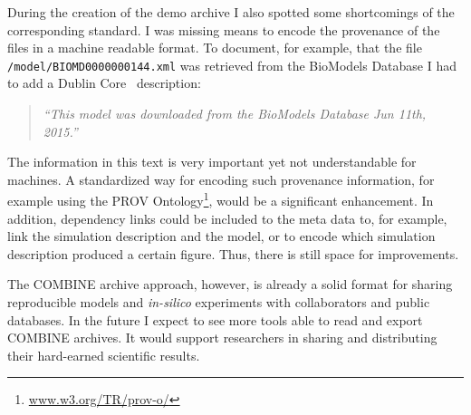 During the creation of the demo archive I also spotted some shortcomings of the corresponding standard.
I was missing means to encode the provenance of the files in a machine readable format.
To document, for example, that the file \texttt{/model/BIOMD0000000144.xml} was retrieved from the BioModels Database I had to add a Dublin Core~\cite{dc} description:
\begin{quote}
\textit{``This model was downloaded from the BioModels Database Jun 11th, 2015.''}
\end{quote}
The information in this text is very important yet not understandable for machines.
A standardized way for encoding such provenance information, for example using the PROV Ontology\footnote{\href{http://www.w3.org/TR/prov-o/}{www.w3.org/TR/prov-o/}}, would be a significant enhancement.
In addition, dependency links could be included to the meta data to, for example, link the simulation description and the model, or to encode which simulation description produced a certain figure.
Thus, there is still space for improvements.

The COMBINE archive approach, however, is already a solid format for sharing reproducible models and \textit{in-silico} experiments with collaborators and public databases.
In the future I expect to see more tools able to read and export COMBINE archives.
It would support researchers in sharing and distributing their hard-earned scientific results.


% 
% 
% 
% 
% 
% 
% 
% 

